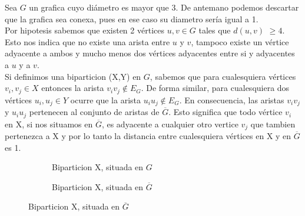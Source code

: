 \documentclass[12pt]{article}
\begin{document}
Sea $G$ un grafica cuyo diámetro es mayor que 3. De antemano podemos descartar que la grafica sea conexa, pues en ese caso su diametro sería igual a 1.\\

Por hipotesis sabemos que existen 2 vértices $u,v\in G$ tales que $d(u,v)$ $\geq 4$. Esto nos indica que no existe una arista entre $u$ y $v$, tampoco existe un vértice adyacente a ambos y mucho menos dos vértices adyacentes entre si y adyacentes a $u$ y a $v$.\\

Si definimos una biparticion (X,Y) en $G$, sabemos que para cualesquiera vértices  $v_i,v_j \in X$ entonces la arista $v_iv_j \notin E_G$. De forma similar, para cualesquiera dos vértices $u_i,u_j \in Y$ ocurre que la arista  $u_iu_j \notin E_G$. En consecuencia, las aristas  $v_iv_j$ y $u_iu_j$ pertenecen al conjunto de aristas de $\overline{G}$. Esto significa que todo vértice $v_i$ en X, si nos situamos en $\overline{G}$, es adyacente a cualquier otro vertice $v_j$ que tambien pertenezca a X y por lo tanto la distancia entre cualesquiera vértices en X y en $\overline{G}$ es 1.\\
	
\begin{figure}[h!]
    \begin{subfigure}{0.5\textwidth}
        \centering
        \caption{Biparticion X, situada en $G$}
    \end{subfigure}
    \begin{subfigure}{0.5\textwidth}
        \centering
        \caption{Biparticion X, situada en $\overline{G}$}
    \end{subfigure}
\end{figure}
\end{document}
